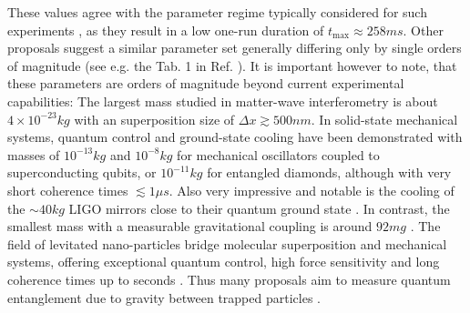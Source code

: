 These values agree with the parameter regime typically considered for such experiments \cite[Timestamp: 51:00]{Aspelmeyer_2024}, as they result in a low one-run duration of $t_\mathrm{max}\approx 258\si{ms}$.
Other proposals suggest a similar parameter set generally differing only by single orders of magnitude (see e.g. the Tab. 1 in Ref. \cite{Rijavec_2021}).
It is important however to note,  that these parameters are orders of magnitude beyond current experimental capabilities:
The largest mass studied in matter-wave interferometry is about $4\times 10^{-23}\si{kg}$ \cite{Fein_2019} with an superposition size of $\Delta x \gtrsim 500\si{nm}$.
In solid-state mechanical systems, quantum control and ground-state cooling have been demonstrated with masses of $10^{-13}\si{kg}$ \cite{OConnell_2010} and $10^{-8}\si{kg}$ \cite{Bild_2023} for mechanical oscillators coupled to superconducting qubits, or $10^{-11}\si{kg}$ \cite{Lee_2011} for entangled diamonds, although with very short coherence times $\lesssim 1\si{\mu s}$.
Also very impressive and notable is the cooling of the $\sim 40\si{kg}$ LIGO mirrors close to their quantum ground state \cite{Whittle_2021}.
In contrast, the smallest mass with a measurable gravitational coupling is around $92 \si{mg}$ \cite{Westphal_2021}.
The field of levitated nano-particles bridge molecular superposition and mechanical systems, offering exceptional quantum control, high force sensitivity and long coherence times up to seconds \cite{Aspelmeyer_2024}.
Thus many proposals aim to measure quantum entanglement due to gravity between trapped particles \cite{Krisnanda_2020}.


